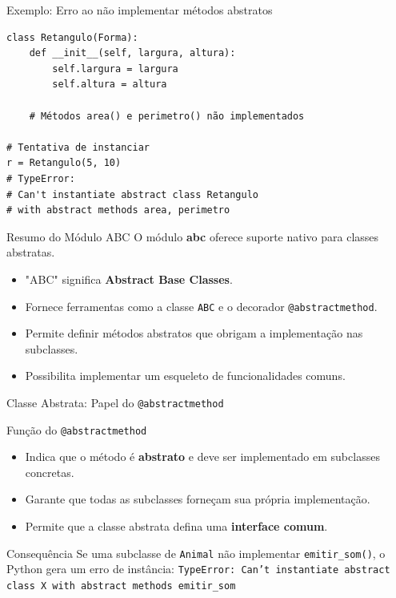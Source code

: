\begin{frame}[fragile]{Exemplo: Erro ao não implementar métodos abstratos}
\small
\begin{verbatim}
class Retangulo(Forma):
    def __init__(self, largura, altura):
        self.largura = largura
        self.altura = altura

    # Métodos area() e perimetro() não implementados

# Tentativa de instanciar
r = Retangulo(5, 10)
# TypeError:
# Can't instantiate abstract class Retangulo
# with abstract methods area, perimetro
\end{verbatim}
\end{frame}


\begin{frame}{Resumo do Módulo ABC}
    O módulo \textbf{abc} oferece suporte nativo para classes abstratas.  
    \begin{itemize}
        \item "ABC" significa \textbf{Abstract Base Classes}.
        \item Fornece ferramentas como a classe \texttt{ABC} e o decorador \texttt{@abstractmethod}.
        \item Permite definir métodos abstratos que obrigam a implementação nas subclasses.
        \item Possibilita implementar um esqueleto de funcionalidades comuns.

    \end{itemize}
\end{frame}



\begin{frame}[fragile]{Classe Abstrata: Papel do \texttt{@abstractmethod}}

\begin{block}{Função do \texttt{@abstractmethod}}
\begin{itemize}
    \item Indica que o método é \textbf{abstrato} e deve ser implementado em subclasses concretas.
    \item Garante que todas as subclasses forneçam sua própria implementação.
    \item Permite que a classe abstrata defina uma \textbf{interface comum}.
\end{itemize}
\end{block}

\begin{block}{Consequência}
Se uma subclasse de \texttt{Animal} não implementar \texttt{emitir\_som()}, o Python gera um erro de instância:  
\texttt{TypeError: Can't instantiate abstract class X with abstract methods emitir\_som}
\end{block}




\end{frame}

